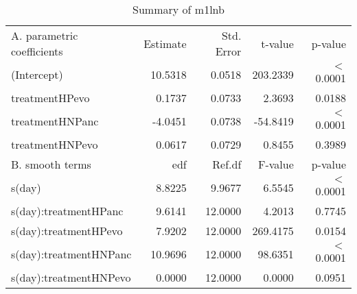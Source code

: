 \begin{table}[ht]
\centering
\begin{tabular}{lrrrr}
   \hline
A. parametric coefficients & Estimate & Std. Error & t-value & p-value \\ 
  (Intercept) & 10.5318 & 0.0518 & 203.2339 & $<$ 0.0001 \\ 
  treatmentHPevo & 0.1737 & 0.0733 & 2.3693 & 0.0188 \\ 
  treatmentHNPanc & -4.0451 & 0.0738 & -54.8419 & $<$ 0.0001 \\ 
  treatmentHNPevo & 0.0617 & 0.0729 & 0.8455 & 0.3989 \\ 
   \hline
B. smooth terms & edf & Ref.df & F-value & p-value \\ 
  s(day) & 8.8225 & 9.9677 & 6.5545 & $<$ 0.0001 \\ 
  s(day):treatmentHPanc & 9.6141 & 12.0000 & 4.2013 & 0.7745 \\ 
  s(day):treatmentHPevo & 7.9202 & 12.0000 & 269.4175 & 0.0154 \\ 
  s(day):treatmentHNPanc & 10.9696 & 12.0000 & 98.6351 & $<$ 0.0001 \\ 
  s(day):treatmentHNPevo & 0.0000 & 12.0000 & 0.0000 & 0.0951 \\ 
   \hline
\end{tabular}
\caption{Summary of m1lnb} 
\label{tab.gam}
\end{table}

